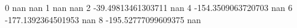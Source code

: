 0 nan nan
1 nan nan
2 -39.49813461303711 nan
4 -154.3509063720703 nan
6 -177.1392364501953 nan
8 -195.52777099609375 nan
